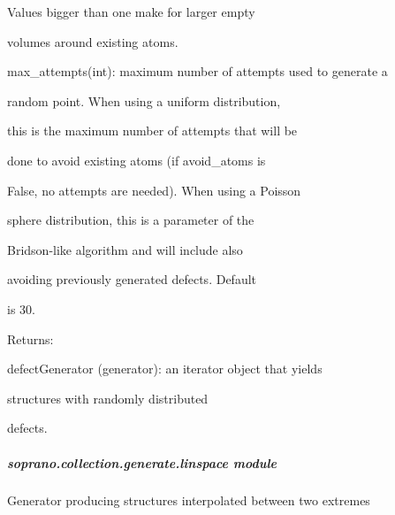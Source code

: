 \documentclass[letterpaper,10pt,english]{sphinxmanual}
\begin{document}
\begin{fulllineitems}
\begin{DUlineblock}{0em}
\begin{DUlineblock}{\DUlineblockindent}
\begin{DUlineblock}{\DUlineblockindent}
\item[] Values bigger than one make for larger empty
\item[] volumes around existing atoms.
\end{DUlineblock}
\item[] max\_attempts(int): maximum number of attempts used to generate a
\item[]
\begin{DUlineblock}{\DUlineblockindent}
\item[] random point. When using a uniform distribution,
\item[] this is the maximum number of attempts that will be
\item[] done to avoid existing atoms (if avoid\_atoms is 
\item[] False, no attempts are needed). When using a Poisson
\item[] sphere distribution, this is a parameter of the
\item[] Bridson-like algorithm and will include also
\item[] avoiding previously generated defects. Default
\item[] is 30.
\end{DUlineblock}
\end{DUlineblock}
\end{DUlineblock}

\begin{DUlineblock}{0em}
\item[] Returns:
\item[]
\begin{DUlineblock}{\DUlineblockindent}
\item[] defectGenerator (generator): an iterator object that yields
\item[]
\begin{DUlineblock}{\DUlineblockindent}
\item[] structures with randomly distributed
\item[] defects.
\end{DUlineblock}
\end{DUlineblock}
\end{DUlineblock}

\end{fulllineitems}



\subparagraph{soprano.collection.generate.linspace module}
\label{doctree/soprano.collection.generate.linspace::doc}\label{doctree/soprano.collection.generate.linspace:soprano-collection-generate-linspace-module}\label{doctree/soprano.collection.generate.linspace:module-soprano.collection.generate.linspace}
Generator producing structures interpolated between two extremes
\end{document}
